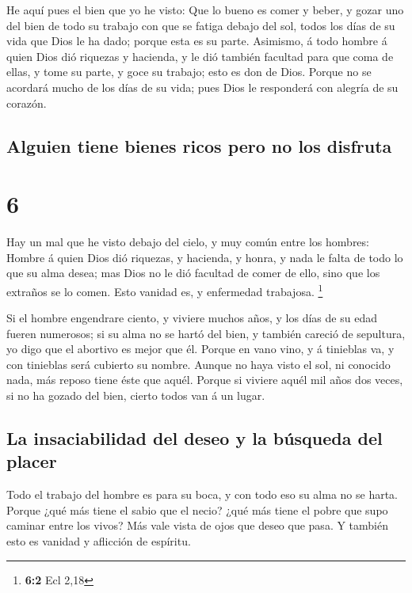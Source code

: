  He aquí pues el bien que yo he visto: Que lo bueno es
comer y beber, y gozar uno del bien de todo su trabajo con que se fatiga
debajo del sol, todos los días de su vida que Dios le ha dado; porque
esta es su parte.  Asimismo, á todo hombre á quien Dios dió
riquezas y hacienda, y le dió también facultad para que coma de ellas, y
tome su parte, y goce su trabajo; esto es don de Dios. 
Porque no se acordará mucho de los días de su vida; pues Dios le
responderá con alegría de su corazón.

\hypertarget{alguien-tiene-bienes-ricos-pero-no-los-disfruta}{%
\subsection{Alguien tiene bienes ricos pero no los
disfruta}\label{alguien-tiene-bienes-ricos-pero-no-los-disfruta}}

\hypertarget{section-5}{%
\section{6}\label{section-5}}

 Hay un mal que he visto debajo del cielo, y muy común entre
los hombres:  Hombre á quien Dios dió riquezas, y hacienda,
y honra, y nada le falta de todo lo que su alma desea; mas Dios no le
dió facultad de comer de ello, sino que los extraños se lo comen. Esto
vanidad es, y enfermedad trabajosa. \footnote{\textbf{6:2} Ecl 2,18}

 Si el hombre engendrare ciento, y viviere muchos años, y
los días de su edad fueren numerosos; si su alma no se hartó del bien, y
también careció de sepultura, yo digo que el abortivo es mejor que él.
 Porque en vano vino, y á tinieblas va, y con tinieblas será
cubierto su nombre.  Aunque no haya visto el sol, ni
conocido nada, más reposo tiene éste que aquél.  Porque si
viviere aquél mil años dos veces, si no ha gozado del bien, cierto todos
van á un lugar.

\hypertarget{la-insaciabilidad-del-deseo-y-la-buxfasqueda-del-placer}{%
\subsection{La insaciabilidad del deseo y la búsqueda del
placer}\label{la-insaciabilidad-del-deseo-y-la-buxfasqueda-del-placer}}

 Todo el trabajo del hombre es para su boca, y con todo eso
su alma no se harta.  Porque ¿qué más tiene el sabio que el
necio? ¿qué más tiene el pobre que supo caminar entre los vivos?
 Más vale vista de ojos que deseo que pasa. Y también esto
es vanidad y aflicción de espíritu.

